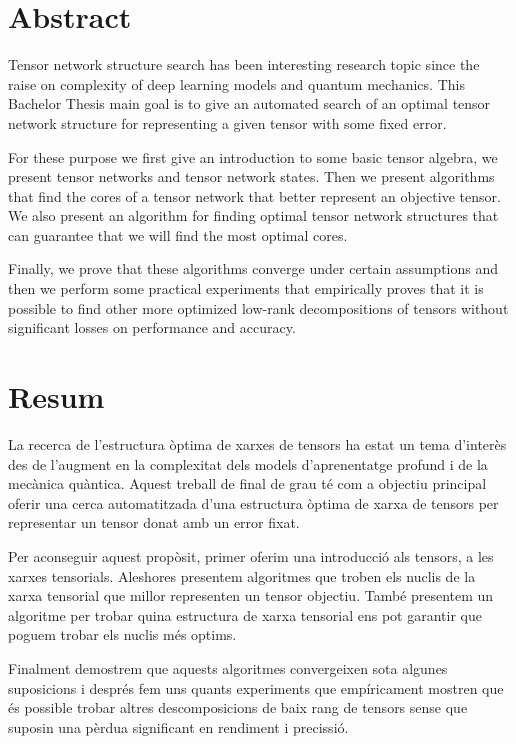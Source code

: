 \documentclass[11pt,a4paper,openright,oneside]{book}
\numberwithin{equation}{section}
\begin{document}
\newpage
{} 

\section*{Abstract}

Tensor network structure search has been interesting research topic since the raise on
complexity of deep learning models and quantum mechanics. This Bachelor Thesis main goal is to give an 
automated search of an optimal tensor network structure for representing a given
tensor with some fixed error.

For these purpose we first give an introduction to some basic tensor algebra, we present tensor networks and tensor
network states. Then we present algorithms that find the cores of a tensor network that better represent an objective tensor.
We also present an algorithm for finding optimal tensor network structures that can guarantee that we will find
the most optimal cores.

Finally, we prove that these algorithms converge under certain assumptions and then we perform
some practical experiments that empirically proves that it is possible to find other more optimized low-rank decompositions of tensors
without significant losses on performance and accuracy.

\section*{Resum}

La recerca de l'estructura òptima de xarxes de tensors ha estat un tema d'interès des de l'augment en la complexitat dels models d'aprenentatge profund i de la mecànica quàntica. 
Aquest treball de final de grau té com a objectiu principal oferir una cerca automatitzada 
d’una estructura òptima de xarxa de tensors per representar un tensor donat amb un error fixat.

Per aconseguir aquest propòsit, primer oferim una introducció als tensors, a les xarxes tensorials. 
Aleshores presentem algoritmes que troben els nuclis de la xarxa tensorial que millor representen un tensor objectiu.
També presentem un algoritme per trobar quina estructura de xarxa tensorial ens pot garantir que poguem trobar els nuclis més optims.

Finalment demostrem que aquests algoritmes convergeixen sota algunes suposicions i després fem
uns quants experiments que empíricament mostren que és possible trobar altres descomposicions de baix rang de tensors
sense que suposin una pèrdua significant en rendiment i precissió.
\end{document}
